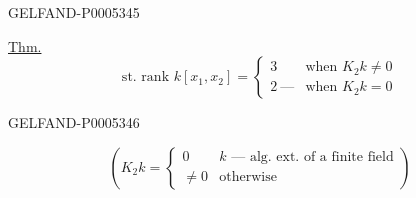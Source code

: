 \begin{GelfandAdjacentEvidence}{GELFAND-P000534}{5}


\uline{Thm.}
\[
\text{st. rank } k[x_1,x_2]=
\begin{cases}
3 & \text{when }K_2k\ne0\\
2\ \text{—} & \text{when }K_2k=0
\end{cases}
\]
\end{GelfandAdjacentEvidence}
\begin{GelfandAdjacentEvidence}{GELFAND-P000534}{6}

\[
\left(
K_2k=
\begin{cases}
0 & k\text{ — alg. ext. of a finite field}\\
\ne0 & \text{otherwise}
\end{cases}
\right)
\]
\end{GelfandAdjacentEvidence}



